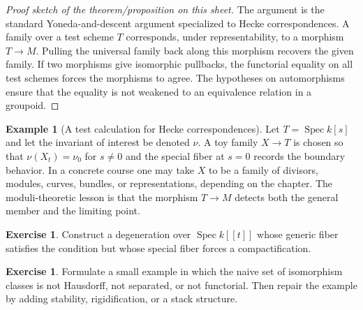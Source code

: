 \documentclass[11pt]{amsart}
\theoremstyle{definition}
\newtheorem{example}[theorem]{Example}
\newtheorem{exercise}[theorem]{Exercise}
\newcommand{\Spec}{\operatorname{Spec}}
\begin{document}
\begin{proof}[Proof sketch of the theorem/proposition on this sheet]
The argument is the standard Yoneda-and-descent argument specialized to Hecke correspondences.  A family over a test scheme $T$ corresponds, under representability, to a morphism $T\to M$.  Pulling the universal family back along this morphism recovers the given family.  If two morphisms give isomorphic pullbacks, the functorial equality on all test schemes forces the morphisms to agree.  The hypotheses on automorphisms ensure that the equality is not weakened to an equivalence relation in a groupoid.
\end{proof}
\begin{example}[A test calculation for Hecke correspondences]
Let $T=\Spec k[s]$ and let the invariant of interest be denoted $\nu$.  A toy family $X\to T$ is chosen so that $\nu(X_t)=\nu_0$ for $s\ne0$ and the special fiber at $s=0$ records the boundary behavior.  In a concrete course one may take $X$ to be a family of divisors, modules, curves, bundles, or representations, depending on the chapter.  The moduli-theoretic lesson is that the morphism $T\to M$ detects both the general member and the limiting point.
\end{example}
\begin{exercise}
Construct a degeneration over $\Spec k[[t]]$ whose generic fiber satisfies the condition but whose special fiber forces a compactification.
\end{exercise}
\begin{exercise}
Formulate a small example in which the naive set of isomorphism classes is not Hausdorff, not separated, or not functorial.  Then repair the example by adding stability, rigidification, or a stack structure.
\end{exercise}
\clearpage
\end{document}
